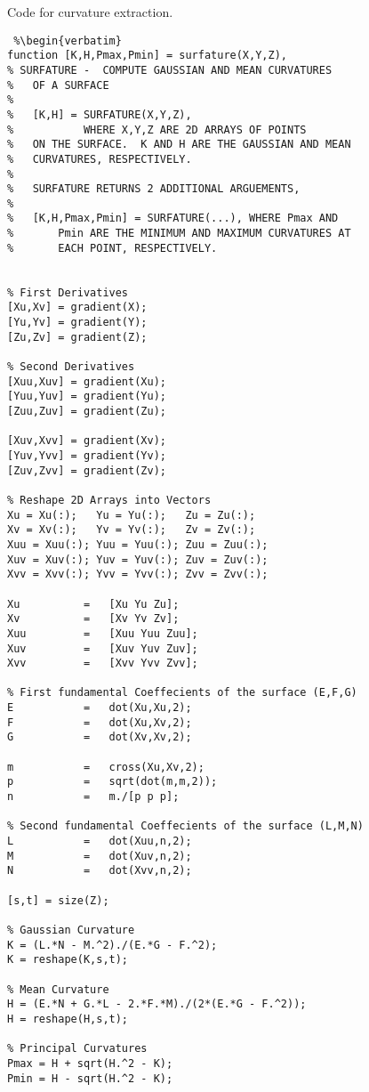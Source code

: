 Code for curvature extraction.

\begin{lstlisting} %\begin{verbatim}
function [K,H,Pmax,Pmin] = surfature(X,Y,Z),
% SURFATURE -  COMPUTE GAUSSIAN AND MEAN CURVATURES
%   OF A SURFACE
%
%   [K,H] = SURFATURE(X,Y,Z),
%           WHERE X,Y,Z ARE 2D ARRAYS OF POINTS
%   ON THE SURFACE.  K AND H ARE THE GAUSSIAN AND MEAN
%   CURVATURES, RESPECTIVELY.
%
%   SURFATURE RETURNS 2 ADDITIONAL ARGUEMENTS,
%
%   [K,H,Pmax,Pmin] = SURFATURE(...), WHERE Pmax AND
%       Pmin ARE THE MINIMUM AND MAXIMUM CURVATURES AT
%       EACH POINT, RESPECTIVELY.


% First Derivatives
[Xu,Xv] = gradient(X);
[Yu,Yv] = gradient(Y);
[Zu,Zv] = gradient(Z);

% Second Derivatives
[Xuu,Xuv] = gradient(Xu);
[Yuu,Yuv] = gradient(Yu);
[Zuu,Zuv] = gradient(Zu);

[Xuv,Xvv] = gradient(Xv);
[Yuv,Yvv] = gradient(Yv);
[Zuv,Zvv] = gradient(Zv);

% Reshape 2D Arrays into Vectors
Xu = Xu(:);   Yu = Yu(:);   Zu = Zu(:);
Xv = Xv(:);   Yv = Yv(:);   Zv = Zv(:);
Xuu = Xuu(:); Yuu = Yuu(:); Zuu = Zuu(:);
Xuv = Xuv(:); Yuv = Yuv(:); Zuv = Zuv(:);
Xvv = Xvv(:); Yvv = Yvv(:); Zvv = Zvv(:);

Xu          =   [Xu Yu Zu];
Xv          =   [Xv Yv Zv];
Xuu         =   [Xuu Yuu Zuu];
Xuv         =   [Xuv Yuv Zuv];
Xvv         =   [Xvv Yvv Zvv];

% First fundamental Coeffecients of the surface (E,F,G)
E           =   dot(Xu,Xu,2);
F           =   dot(Xu,Xv,2);
G           =   dot(Xv,Xv,2);

m           =   cross(Xu,Xv,2);
p           =   sqrt(dot(m,m,2));
n           =   m./[p p p];

% Second fundamental Coeffecients of the surface (L,M,N)
L           =   dot(Xuu,n,2);
M           =   dot(Xuv,n,2);
N           =   dot(Xvv,n,2);

[s,t] = size(Z);

% Gaussian Curvature
K = (L.*N - M.^2)./(E.*G - F.^2);
K = reshape(K,s,t);

% Mean Curvature
H = (E.*N + G.*L - 2.*F.*M)./(2*(E.*G - F.^2));
H = reshape(H,s,t);

% Principal Curvatures
Pmax = H + sqrt(H.^2 - K);
Pmin = H - sqrt(H.^2 - K);
\end{lstlisting} %
\clearpage

